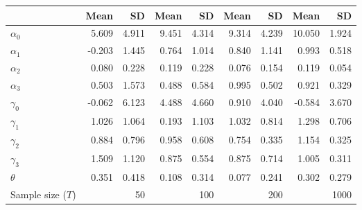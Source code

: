 
\begin{tabular}[t]{lrrrrrrrr}
\toprule
  & Mean & SD & Mean  & SD  & Mean   & SD   & Mean    & SD   \\
\midrule
$\alpha_{0}$ & 5.609 & 4.911 & 9.451 & 4.314 & 9.314 & 4.239 & 10.050 & 1.924\\
$\alpha_{1}$ & -0.203 & 1.445 & 0.764 & 1.014 & 0.840 & 1.141 & 0.993 & 0.518\\
$\alpha_{2}$ & 0.080 & 0.228 & 0.119 & 0.228 & 0.076 & 0.154 & 0.119 & 0.054\\
$\alpha_{3}$ & 0.503 & 1.573 & 0.488 & 0.584 & 0.995 & 0.502 & 0.921 & 0.329\\
$\gamma_{0}$ & -0.062 & 6.123 & 4.488 & 4.660 & 0.910 & 4.040 & -0.584 & 3.670\\
$\gamma_{1}$ & 1.026 & 1.064 & 0.193 & 1.103 & 1.032 & 0.814 & 1.298 & 0.706\\
$\gamma_{2}$ & 0.884 & 0.796 & 0.958 & 0.608 & 0.754 & 0.335 & 1.154 & 0.325\\
$\gamma_{3}$ & 1.509 & 1.120 & 0.875 & 0.554 & 0.875 & 0.714 & 1.005 & 0.311\\
$\theta$ & 0.351 & 0.418 & 0.108 & 0.314 & 0.077 & 0.241 & 0.302 & 0.279\\
Sample size ($T$) &  & 50 &  & 100 &  & 200 &  & 1000\\
\bottomrule
\end{tabular}
